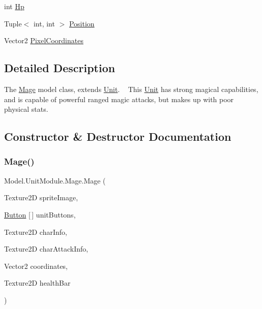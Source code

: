 \begin{DoxyCompactItemize}
\item 
int \hyperlink{class_model_1_1_unit_module_1_1_mage_a6a68c5f76a92eb24bb171f740a99e681}{Hp}
\item 
Tuple$<$ int, int $>$ \hyperlink{class_model_1_1_unit_module_1_1_mage_a53b0e4a5a23887d56d2b359f676dafa7}{Position}
\item 
Vector2 \hyperlink{class_model_1_1_unit_module_1_1_mage_ae115e4497d06b8938ceee7344dd1350d}{Pixel\+Coordinates}
\end{DoxyCompactItemize}


\subsection{Detailed Description}
The \hyperlink{class_model_1_1_unit_module_1_1_mage}{Mage} model class, extends \hyperlink{interface_model_1_1_unit_module_1_1_unit}{Unit}. ~\newline
 This \hyperlink{interface_model_1_1_unit_module_1_1_unit}{Unit} has strong magical capabilities, and is capable of powerful ranged magic attacks, but makes up with poor physical stats. 



\subsection{Constructor \& Destructor Documentation}
\hypertarget{class_model_1_1_unit_module_1_1_mage_a7ffb443153df0abdc04ceb1da6f1b241}{}\label{class_model_1_1_unit_module_1_1_mage_a7ffb443153df0abdc04ceb1da6f1b241} 
\subsubsection{\texorpdfstring{Mage()}{Mage()}}
{\footnotesize\ttfamily Model.\+Unit\+Module.\+Mage.\+Mage (\begin{DoxyParamCaption}\item[{Texture2D}]{sprite\+Image,  }\item[{\hyperlink{class_model_1_1_button}{Button} \mbox{[}$\,$\mbox{]}}]{unit\+Buttons,  }\item[{Texture2D}]{char\+Info,  }\item[{Texture2D}]{char\+Attack\+Info,  }\item[{Vector2}]{coordinates,  }\item[{Texture2D}]{health\+Bar }\end{DoxyParamCaption})\hspace{0.3cm}{\ttfamily [inline]}}

